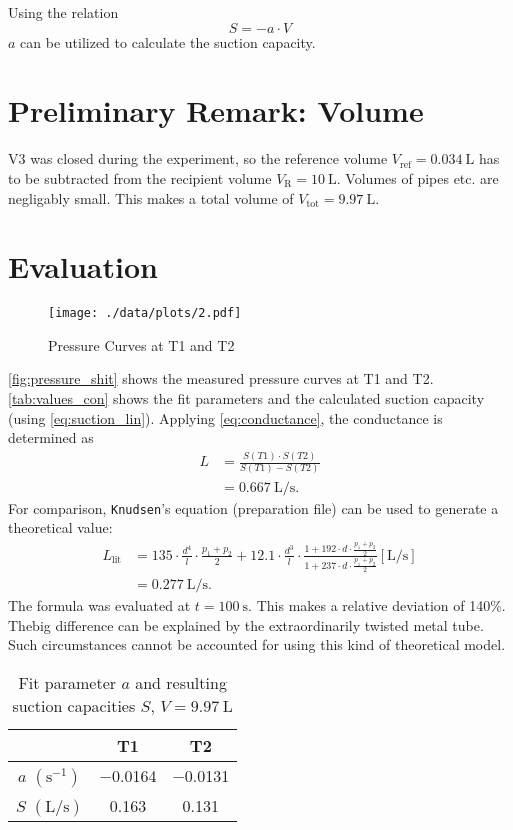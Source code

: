 Using the relation
\begin{equation}\label{eq:suction_lin}
	S=-a\cdot V
\end{equation}
$a$ can be utilized to calculate the suction capacity.

\section*{Preliminary Remark: Volume}
V3 was closed during the experiment, so the reference volume $V_\text{ref}=\SI{0.034}{\liter}$ has to be subtracted from the recipient volume $V_\text{R}=\SI{10}{\liter}$.
Volumes of pipes etc. are negligably small.
This makes a total volume of $V_\text{tot}=\SI{9.97}{\liter}$.

\section{Evaluation}
\begin{figure}[tbp]
	\centering
	\texttt{[image: ./data/plots/2.pdf]}
	\caption[Pressure Curves for T1 and T2]{Pressure Curves at T1 and T2}
	\label{fig:pressure_shit}
\end{figure}
\autoref{fig:pressure_shit} shows the measured pressure curves at T1 and T2.
\autoref{tab:values_con} shows the fit parameters and the calculated suction capacity (using \autoref{eq:suction_lin}).
Applying \autoref{eq:conductance}, the conductance is determined as
\begin{align*}
	L &= \frac{S(T1)\cdot S(T2)}{S(T1)-S(T2)} \\
		&= \SI{0.667}{\liter\per\second}.
\end{align*}
For comparison, \texttt{Knudsen}'s equation (preparation file) can be used to generate a theoretical value:
\begin{align*}
	L_\text{lit} &= 135\cdot\frac{d^4}{l}\cdot\frac{p_1+p_2}{2}+\num{12.1}\cdot\frac{d^3}{l}\cdot\frac{1+192\cdot d\cdot\frac{p_1+p_2}{2}}{1+237\cdot d\cdot\frac{p_1+p_2}{2}} \left[\si{\liter\per\second}\right]	\\
	&=\SI{0.277}{\liter\per\second}.
\end{align*}
The formula was evaluated at $t=\SI{100}{\second}$.
This makes a relative deviation of \num{140}\%.
Thebig difference can be explained by the extraordinarily twisted metal tube.
Such circumstances cannot be accounted for using this kind of theoretical model. 
\begin{table}[b!]
	\centering
	\label{tab:values_con}
	\caption[Fit parameters and suction capacities]{Fit parameter $a$ and resulting suction capacities $S$, $V=\SI{9.97}{\liter}$}
	\begin{tabular}{S|SS}
		\toprule
		{}&	{T1}&	{T2}\\
		\midrule
		{$a$ $(\si{\second}^{-1})$}	&	\num{-0.0164}	&	\num{-0.0131}	\\
		{$S$ $(\si{\liter\per\second})$}	&	0.163	&	0.131	\\
		\bottomrule
	\end{tabular}
\end{table}
